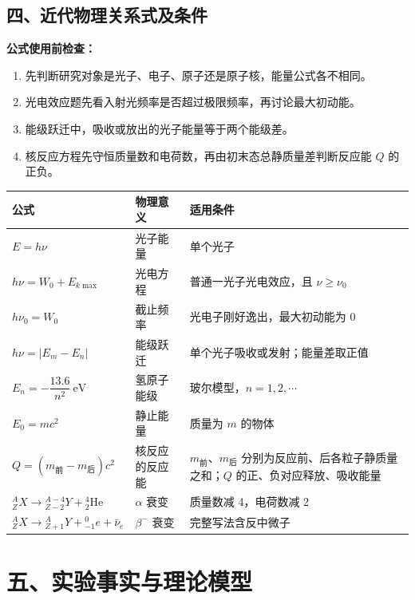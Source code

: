 \begin{samepage}
\section*{四、近代物理关系式及条件}

\textbf{公式使用前检查：}
\nopagebreak[4]
\begin{enumerate}
  \item 先判断研究对象是光子、电子、原子还是原子核，能量公式各不相同。
  \item 光电效应题先看入射光频率是否超过极限频率，再讨论最大初动能。
  \item 能级跃迁中，吸收或放出的光子能量等于两个能级差。
  \item 核反应方程先守恒质量数和电荷数，再由初末态总静质量差判断反应能 $Q$ 的正负。
\end{enumerate}
\end{samepage}

\begin{center}
\begingroup
\renewcommand{\arraystretch}{1.18}
\begin{tabular}{p{}p{}p{}}
\toprule
公式 & 物理意义 & 适用条件 \\
\midrule
$E=h\nu$ & 光子能量 & 单个光子 \\
$h\nu=W_0+E_{k\max}$ & 光电方程 & 普通一光子光电效应，且 $\nu\ge\nu_0$ \\
$h\nu_0=W_0$ & 截止频率 & 光电子刚好逸出，最大初动能为 0 \\
$h\nu=|E_m-E_n|$ & 能级跃迁 & 单个光子吸收或发射；能量差取正值 \\
$E_n=-\dfrac{13.6}{n^2}\ \mathrm{eV}$ & 氢原子能级 & 玻尔模型，$n=1,2,\cdots$ \\
$E_0=mc^2$ & 静止能量 & 质量为 $m$ 的物体 \\
$Q=(m_{\text{前}}-m_{\text{后}})c^2$ & 核反应的反应能 & $m_{\text{前}}$、$m_{\text{后}}$ 分别为反应前、后各粒子静质量之和；$Q$ 的正、负对应释放、吸收能量 \\
${}^{A}_{Z}X\rightarrow{}^{A-4}_{Z-2}Y+{}^4_2\mathrm{He}$ & $\alpha$ 衰变 & 质量数减 4，电荷数减 2 \\
${}^{A}_{Z}X\rightarrow{}^{A}_{Z+1}Y+{}^0_{-1}e+\bar{\nu}_e$ & $\beta^-$ 衰变 & 完整写法含反中微子 \\
\bottomrule
\end{tabular}
\endgroup
\end{center}

\section*{五、实验事实与理论模型}

